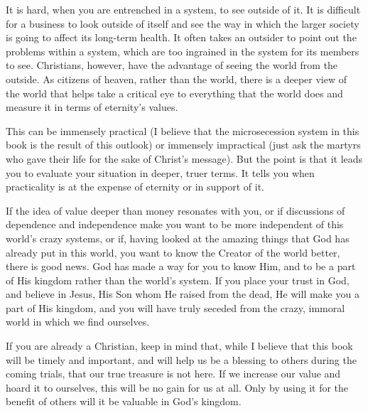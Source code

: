 It is hard, when you are entrenched in a system, to see outside of it.
It is difficult for a business to look outside of itself and see the
way in which the larger society is going to affect its long-term
health. It often takes an outsider to point out the problems within a
system, which are too ingrained in the system for its members to see.
Christians, however, have the advantage of seeing the world from the
outside. As citizens of heaven, rather than the world, there is a
deeper view of the world that helps take a critical eye to everything
that the world does and measure it in terms of
eternity's values.

This can be immensely practical (I believe that the microsecession
system in this book is the result of this outlook) or immensely
impractical (just ask the martyrs who gave their life for the sake of
Christ's message). But the point is that it leads you
to evaluate your situation in deeper, truer terms. It tells you when
practicality is at the expense of eternity or in support of it. 

If the idea of value deeper than money resonates with you, or if
discussions of dependence and independence make you want to be more
independent of this world's crazy systems, or if,
having looked at the amazing things that God has already put in this
world, you want to know the Creator of the world better, there is good
news. God has made a way for you to know Him, and to be a part of His
kingdom rather than the world's system. If you place
your trust in God, and believe in Jesus, His Son whom He raised from
the dead, He will make you a part of His kingdom, and you will have
truly seceded from the crazy, immoral world in which we find
ourselves.

If you are already a Christian, keep in mind that, while I believe that
this book will be timely and important, and will help us be a blessing
to others during the coming trials, that our true treasure is not here.
 If we increase our value and hoard it to ourselves, this will be no
gain for us at all.  Only by using it for the benefit of others will it
be valuable in God's kingdom.
